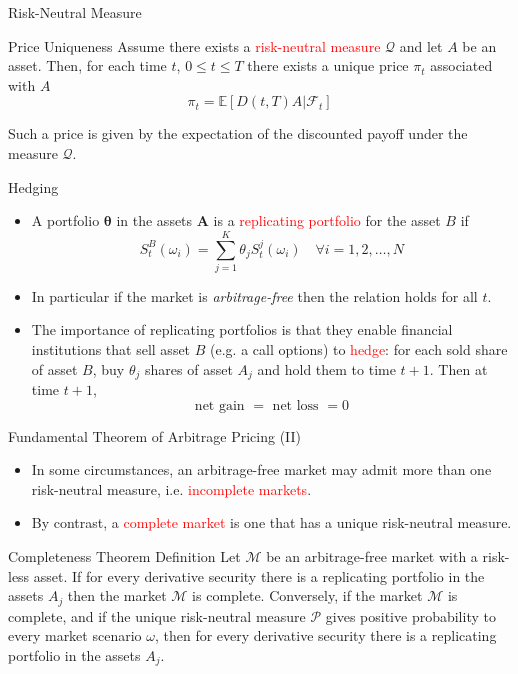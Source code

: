 \documentclass{beamer}
\begin{document}
\begin{frame}{Risk-Neutral Measure}
	\begin{block}{Price Uniqueness}
	Assume there exists a \textcolor{red}{risk-neutral measure} $\mathcal{Q}$ %
	and let $A$ be an asset. Then, for each time $t$, $0\le t\le T$ there exists a unique price $\pi_t$ associated with $A$
	\begin{equation}
		\pi_t = \mathbb{E}[D(t,T)A|\mathcal{F}_t]
		\label{eq:risk_neutral_pricing}
	\end{equation}
\end{block}
Such a price is given by the expectation of the discounted payoff under the measure $\mathcal{Q}$.
\end{frame}

\begin{frame}{Hedging}
	\begin{itemize}
		\item A portfolio $\mathbf{\theta}$ in the assets $\mathbf{A}$ is a \textcolor{red}{replicating portfolio} for the asset $B$ if
		\begin{equation}
			S_t^{B}(\omega_i) = \sum_{j=1}^K \theta_j S_t^j(\omega_i)\quad\forall i=1,2,\ldots,N
		\end{equation}
		\item In particular if the market is \emph{arbitrage-free} then the relation holds for all $t$.
		\item The importance of replicating portfolios is that they enable financial institutions that sell
		asset $B$ (e.g. a call options) to \textcolor{red}{hedge}: for each sold share of asset $B$, buy $\theta_j$ shares
		of asset $A_j$ and hold them to time $t + 1$. Then at time $t + 1$, 
		\begin{equation*}
			\text{net gain }= \text{ net loss } = 0
		\end{equation*}
	\end{itemize}
\end{frame}

\begin{frame}{Fundamental Theorem of Arbitrage Pricing (II)}
	\begin{itemize}
		\item In some circumstances, an arbitrage-free market may admit more than one risk-neutral measure, i.e. \textcolor{red}{incomplete markets}.
		\item By contrast, a \textcolor{red}{complete market} is one that has a unique risk-neutral measure.
	\end{itemize}
	\begin{block}{Completeness Theorem Definition}
		Let $\mathcal{M}$ be an arbitrage-free market with a risk-less asset. If for every derivative security there is a replicating portfolio in the assets $A_j$ then the market $\mathcal{M}$ is complete. Conversely, if the market $\mathcal{M}$ is complete, and if the unique risk-neutral measure $\mathcal{P}$ gives positive probability to every market scenario $\omega$, then for every
		derivative security there is a replicating portfolio in the assets $A_j$.
	\end{block}
\end{frame}
\end{document}
